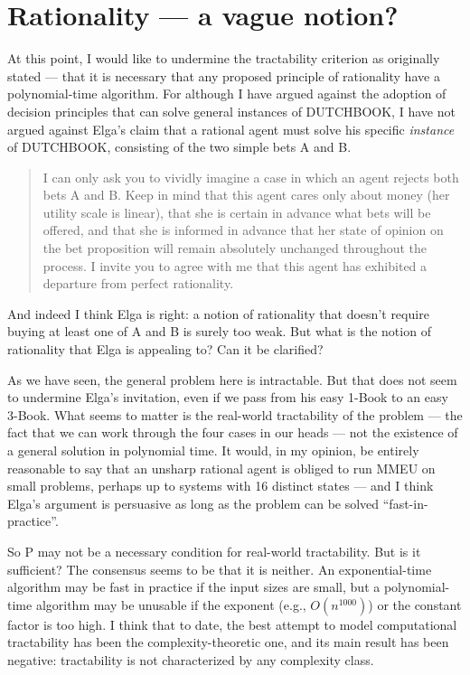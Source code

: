 \documentclass[letterpaper,12pt]{article}
\begin{document}
\section{Rationality --- a vague notion?}
At this point, I would like to undermine the tractability criterion as originally stated --- that it is necessary that any proposed principle of rationality have a polynomial-time algorithm. For although I have argued against the adoption of decision principles that can solve general instances of DUTCHBOOK, I have not argued against Elga's claim that a rational agent must solve his specific \emph{instance} of DUTCHBOOK, consisting of the two simple bets A and B.
\begin{quote}
I can only ask you to vividly imagine a case in which an agent rejects both bets A and B. Keep in mind that this agent cares only about money (her utility scale is linear), that she is certain in advance what bets will be offered, and that she is informed in advance that her state of opinion on the bet proposition will remain absolutely unchanged throughout the process. I invite you to agree with me that this agent has exhibited a departure from perfect rationality.
\end{quote}
And indeed I think Elga is right: a notion of rationality that doesn't require buying at least one of A and B is surely too weak. But what is the notion of rationality that Elga is appealing to? Can it be clarified?

As we have seen, the general problem here is intractable. But that does not seem to undermine Elga's invitation, even if we pass from his easy 1-Book to an easy 3-Book. What seems to matter is the real-world tractability of the problem --- the fact that we can work through the four cases in our heads --- not the existence of a general solution in polynomial time. It would, in my opinion, be entirely reasonable to say that an unsharp rational agent is obliged to run MMEU on small problems, perhaps up to systems with 16 distinct states --- and I think Elga's argument is persuasive as long as the problem can be solved ``fast-in-practice''.

So P may not be a necessary condition for real-world tractability. But is it sufficient? The consensus seems to be that it is neither. An exponential-time algorithm may be fast in practice if the input sizes are small, but a polynomial-time algorithm may be unusable if the exponent (e.g., $O(n^{1000})$) or the constant factor is too high. I think that to date, the best attempt to model computational tractability has been the complexity-theoretic one, and its main result has been negative: tractability is not characterized by any complexity class.
\end{document}
